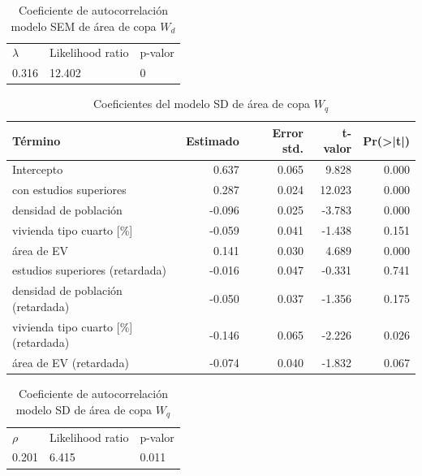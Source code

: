 \documentclass[12pt,a4paper,oneside, openany]{book}
\theoremstyle{definition}
\theoremstyle{definition}
\theoremstyle{definition}
\theoremstyle{remark}
\begin{document}
\begin{table}[H]

\caption{\label{tab:cauto-sem-copa}Coeficiente de autocorrelación modelo SEM de área de copa $W_d$}
\centering
\begin{tabular}{lll}
\toprule
$\lambda$ & Likelihood ratio & p-valor\\
0.316 & 12.402 & 0\\
\bottomrule
\end{tabular}
\end{table}

\begin{table}[H]

\caption{\label{tab:coef-sd-copa-wq}Coeficientes del modelo SD de área de copa $W_q$}
\centering
\begin{tabular}{lrrrr}
\toprule
Término & Estimado & Error std. & t-valor & Pr(>|t|)\\
\midrule
Intercepto & 0.637 & 0.065 & 9.828 & 0.000\\
con estudios superiores & 0.287 & 0.024 & 12.023 & 0.000\\
densidad de población & -0.096 & 0.025 & -3.783 & 0.000\\
vivienda tipo cuarto [\%] & -0.059 & 0.041 & -1.438 & 0.151\\
área de EV & 0.141 & 0.030 & 4.689 & 0.000\\
\addlinespace
estudios superiores (retardada) & -0.016 & 0.047 & -0.331 & 0.741\\
densidad de población (retardada) & -0.050 & 0.037 & -1.356 & 0.175\\
vivienda tipo cuarto [\%] (retardada) & -0.146 & 0.065 & -2.226 & 0.026\\
área de EV (retardada) & -0.074 & 0.040 & -1.832 & 0.067\\
\bottomrule
\end{tabular}
\end{table}

\begin{table}[H]

\caption{\label{tab:cauto-sd-copa-wq}Coeficiente de autocorrelación modelo SD de área de copa $W_q$}
\centering
\begin{tabular}{lll}
\toprule
$\rho$ & Likelihood ratio & p-valor\\
0.201 & 6.415 & 0.011\\
\bottomrule
\end{tabular}
\end{table}
\end{document}
